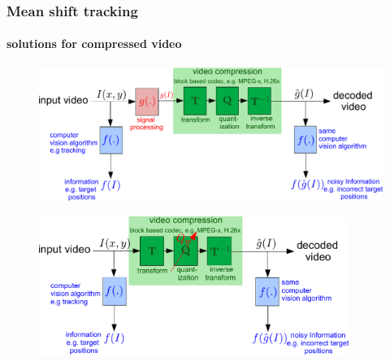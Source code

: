 


\begin{frame}
\frametitle{Mean shift tracking}
\framesubtitle{solutions for compressed video}
\logoCSIPCPL\mypagenum
	\begin{figure}		
		\includegraphics[width=1.0\textwidth]{figs/ICIP2009_SolutionThroughSigProc.pdf}
	\end{figure}
	\begin{figure}
		\includegraphics[width=0.9\textwidth]{figs/TRK_IPCV2009_BlockDiagram_2_VarPar_2.pdf}
	\end{figure}
\end{frame}




